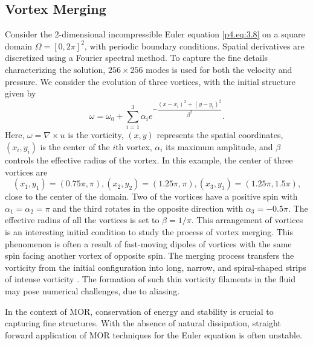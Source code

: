 \subsection{Vortex Merging} \label{p4.sec:res.1}
Consider the 2-dimensional incompressible Euler equation \eqref{p4.eq:3.8} on a square domain $\Omega = [0,2\pi]^2$, with periodic boundary conditions. Spatial derivatives are discretized using a Fourier spectral method. To capture the fine details characterizing the solution, $256\times 256$ modes is used for both the velocity and pressure. We consider the evolution of three vortices, with the initial structure given by
\begin{equation}\label{p4.eqn:initial_cond_vort}
\omega = \omega_0 + \sum_{i=1}^{3} \alpha_i e^{-\dfrac{\left(x-x_i\right)^{2}+\left(y-y_i\right)^{2}}{\beta^2}}.
\end{equation}
Here, $\omega = \nabla \times u$ is the vorticity, $(x,y)$ represents the spatial coordinates, $\left( x_i, y_i\right)$ is the center of the $i$th vortex, $\alpha_i$ its maximum amplitude, and $\beta$ controls the effective radius of the vortex. In this example, the center of three vortices are 
\begin{equation}
\left( x_1, y_1 \right) = \left(0.75\pi,\pi\right) , \left( x_2, y_2 \right) = \left(1.25\pi,\pi\right), \left( x_3, y_3 \right) = \left(1.25\pi,1.5\pi\right),
\end{equation}
close to the center of the domain. Two of the vortices have a positive spin with $\alpha_1 = \alpha_2 = \pi$ and the third rotates in the opposite direction with $\alpha_3 = -0.5\pi$. The effective radius of all the vortices is set to $\beta = 1 / \pi$. This arrangement of vortices is an interesting initial condition to study the process of vortex merging. This phenomenon is often a result of fast-moving dipoles of vortices with the same spin facing another vortex \cite{filaments_vort2} of opposite spin. The merging process transfers the vorticity from the initial configuration into long, narrow, and spiral-shaped strips of intense vorticity \cite{filaments_vort}. The formation of such thin vorticity filaments in the fluid may pose numerical challenges, due to aliasing. 

In the context of MOR, conservation of energy and stability is crucial to capturing fine structures. With the absence of natural dissipation, straight forward application of MOR techniques for the Euler equation is often unstable.

